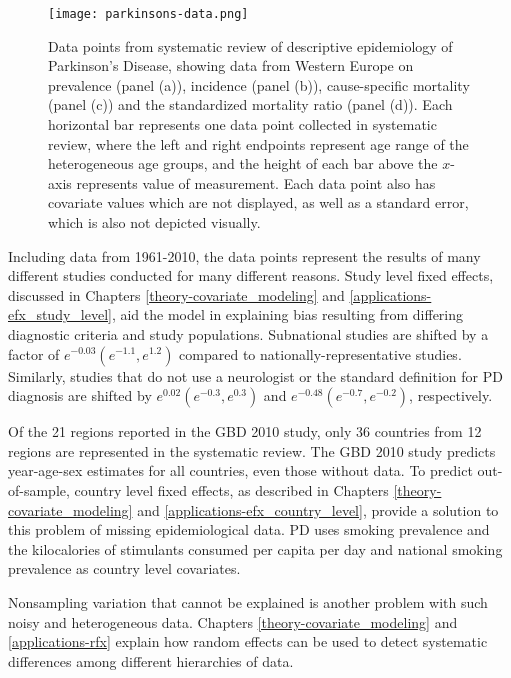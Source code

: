     \begin{figure}[h]
        \begin{center}
            \texttt{[image: parkinsons-data.png]}
            \caption{Data points from systematic review of descriptive
              epidemiology of Parkinson's Disease, showing data from
              Western Europe on prevalence (panel (a)), incidence
              (panel (b)), cause-specific mortality (panel (c)) and
              the standardized mortality ratio (panel (d)).  Each
              horizontal bar represents one data point collected in
              systematic review, where the left and right endpoints
              represent age range of the heterogeneous age groups, and
              the height of each bar above the $x$-axis represents
              value of measurement.  Each data point also has
              covariate values which are not displayed, as well as a
              standard error, which is also not depicted visually.}
            \label{fig:intro-parkinsons data}
        \end{center}
    \end{figure}

Including data from 1961-2010, the data points represent the results
of many different studies conducted for many different reasons.  Study
level fixed effects, discussed in Chapters \ref{theory-covariate_modeling} and
\ref{applications-efx_study_level}, aid the model in explaining bias
resulting from differing diagnostic criteria and study populations.  Subnational 
studies are shifted by a factor of $e^{-0.03} (e^{-1.1}, e^{1.2})$
compared to nationally-representative studies.  Similarly, studies that 
do not use a neurologist or the standard definition for PD diagnosis are shifted 
by $e^{0.02} (e^{-0.3}, e^{0.3})$ and $e^{-0.48} (e^{-0.7}, e^{-0.2})$,
respectively.

Of the 21 regions reported in the GBD 2010 study, only 36 countries
from 12 regions are represented in the systematic review.  The GBD
2010 study predicts year-age-sex estimates for all countries, even
those without data.  To predict out-of-sample, country level fixed
effects, as described in Chapters \ref{theory-covariate_modeling} and
\ref{applications-efx_country_level}, provide a solution to this
problem of missing epidemiological data.  PD uses smoking prevalence and the 
kilocalories of stimulants consumed per capita per day and national smoking prevalence 
as country level covariates.

Nonsampling variation that cannot be explained is another problem with
such noisy and heterogeneous data.  Chapters
\ref{theory-covariate_modeling} and \ref{applications-rfx} explain how
random effects can be used to detect systematic differences among
different hierarchies of data.

